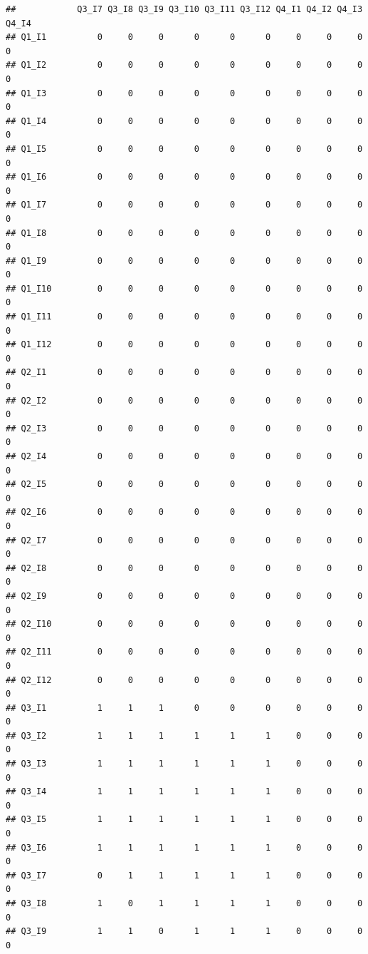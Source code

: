 \documentclass[]{book}
\begin{document}
\begin{verbatim}
##            Q3_I7 Q3_I8 Q3_I9 Q3_I10 Q3_I11 Q3_I12 Q4_I1 Q4_I2 Q4_I3 Q4_I4
## Q1_I1          0     0     0      0      0      0     0     0     0     0
## Q1_I2          0     0     0      0      0      0     0     0     0     0
## Q1_I3          0     0     0      0      0      0     0     0     0     0
## Q1_I4          0     0     0      0      0      0     0     0     0     0
## Q1_I5          0     0     0      0      0      0     0     0     0     0
## Q1_I6          0     0     0      0      0      0     0     0     0     0
## Q1_I7          0     0     0      0      0      0     0     0     0     0
## Q1_I8          0     0     0      0      0      0     0     0     0     0
## Q1_I9          0     0     0      0      0      0     0     0     0     0
## Q1_I10         0     0     0      0      0      0     0     0     0     0
## Q1_I11         0     0     0      0      0      0     0     0     0     0
## Q1_I12         0     0     0      0      0      0     0     0     0     0
## Q2_I1          0     0     0      0      0      0     0     0     0     0
## Q2_I2          0     0     0      0      0      0     0     0     0     0
## Q2_I3          0     0     0      0      0      0     0     0     0     0
## Q2_I4          0     0     0      0      0      0     0     0     0     0
## Q2_I5          0     0     0      0      0      0     0     0     0     0
## Q2_I6          0     0     0      0      0      0     0     0     0     0
## Q2_I7          0     0     0      0      0      0     0     0     0     0
## Q2_I8          0     0     0      0      0      0     0     0     0     0
## Q2_I9          0     0     0      0      0      0     0     0     0     0
## Q2_I10         0     0     0      0      0      0     0     0     0     0
## Q2_I11         0     0     0      0      0      0     0     0     0     0
## Q2_I12         0     0     0      0      0      0     0     0     0     0
## Q3_I1          1     1     1      0      0      0     0     0     0     0
## Q3_I2          1     1     1      1      1      1     0     0     0     0
## Q3_I3          1     1     1      1      1      1     0     0     0     0
## Q3_I4          1     1     1      1      1      1     0     0     0     0
## Q3_I5          1     1     1      1      1      1     0     0     0     0
## Q3_I6          1     1     1      1      1      1     0     0     0     0
## Q3_I7          0     1     1      1      1      1     0     0     0     0
## Q3_I8          1     0     1      1      1      1     0     0     0     0
## Q3_I9          1     1     0      1      1      1     0     0     0     0

\end{verbatim}
\end{document}
